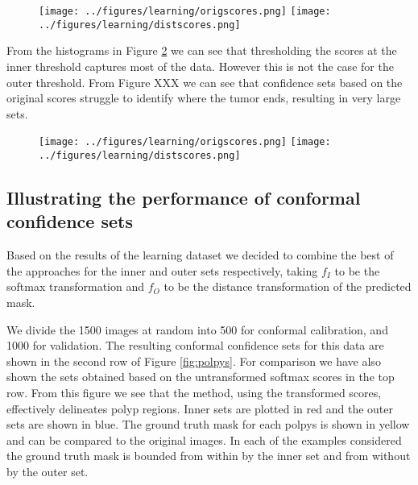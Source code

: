 \begin{figure}
		\centering
		\texttt{[image: ../figures/learning/origscores.png]}
		\texttt{[image: ../figures/learning/distscores.png]}
		\label{scorehists}
\end{figure}
From the histograms in Figure \ref{scorehists} we can see that thresholding the scores at the inner threshold captures most of the data. However this is not the case for the outer threshold. From Figure XXX we can see that confidence sets based on the original scores struggle to identify where the tumor ends, resulting in very large sets. 

\begin{figure}
	\centering
	\texttt{[image: ../figures/learning/origscores.png]}
	\texttt{[image: ../figures/learning/distscores.png]}
	\label{scorehists}
\end{figure}



\subsection{Illustrating the performance of conformal confidence sets}\label{SS:val}
Based on the results of the learning dataset we decided to combine the best of the approaches for the inner and outer sets respectively, taking $f_I$ to be the softmax transformation and $f_O$ to be the distance transformation of the predicted mask.

We divide the 1500 images at random into 500 for conformal calibration, and 1000 for validation. The resulting conformal confidence sets for this data are shown in the second row of Figure \ref{fig:polpys}. For comparison we have also shown the sets obtained based on the untransformed softmax scores in the top row. From this figure we see that the method, using the transformed scores, effectively delineates polyp regions. Inner sets are plotted in red and the outer sets are shown in blue. The ground truth mask for each polpys is shown in yellow and can be compared to the original images. In each of the examples considered the ground truth mask is bounded from within by the inner set and from without by the outer set. 

